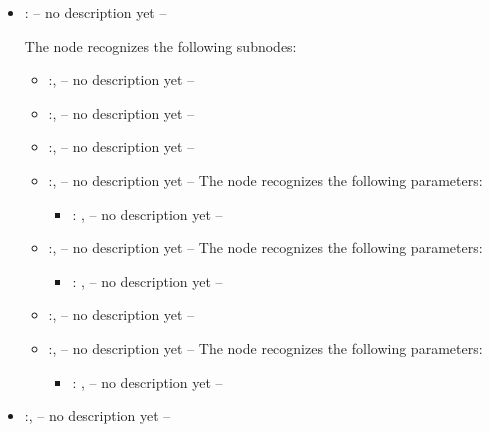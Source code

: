 \begin{itemize}
    \item {}:
      -- no description yet --

      The  node recognizes the following subnodes:
      \begin{itemize}
        \item {}:, 
          -- no description yet --

        \item {}:, 
          -- no description yet --

        \item {}:, 
          -- no description yet --

        \item {}:, 
          -- no description yet --
          The  node recognizes the following parameters:
            \begin{itemize}
              \item {}: , 
                -- no description yet --
          \end{itemize}

        \item {}:, 
          -- no description yet --
          The  node recognizes the following parameters:
            \begin{itemize}
              \item {}: , 
                -- no description yet --
          \end{itemize}

        \item {}:, 
          -- no description yet --

        \item {}:, 
          -- no description yet --
          The  node recognizes the following parameters:
            \begin{itemize}
              \item {}: , 
                -- no description yet --
          \end{itemize}
      \end{itemize}

    \item {}:, 
      -- no description yet --
  \end{itemize}
